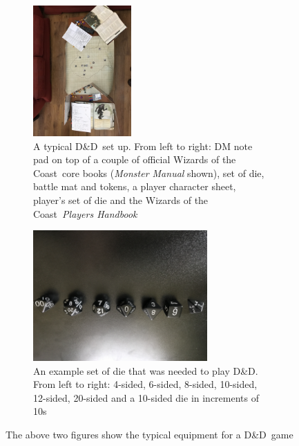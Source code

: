 \documentclass[final]{cmpreport}
\newcommand{\WotC}{Wizards of the Coast}
\newcommand{\dnd}{D\&D}
\begin{document}
			\begin{figure}[h] \label{fig:dnd-equipment}
				\begin{subfigure}{0.5\textwidth}
					\includegraphics[width=\linewidth, height=5cm, angle=180]{DnD_Live.jpg}
					\caption{A typical \dnd \ set up. From left to right: DM note pad on top of a couple of official \WotC \ core books (\emph{Monster Manual} shown), set of die, battle mat and tokens, a player character sheet, player's set of die and the \WotC \ \emph{Players Handbook}} \label{fig:DnDLive}
				\end{subfigure}
				\begin{subfigure}{0.5\textwidth}
					\includegraphics[width=\linewidth, height=5cm, angle=180]{DnD_Dice.jpg}
					\caption{An example set of die that was needed to play \dnd. From left to right: 4-sided, 6-sided, 8-sided, 10-sided, 12-sided, 20-sided and a 10-sided die in increments of 10s} \label{fig:DnDDice}
				\end{subfigure}
				\caption{The above two figures show the typical equipment for a \dnd \ game}
			\end{figure}
			
\end{document}
